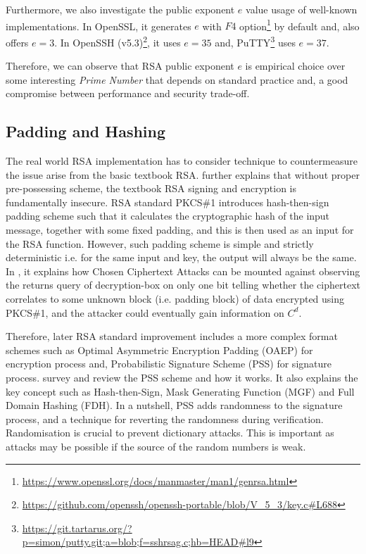 \documentclass[10pt,sigconf]{acmart}
\begin{document}
Furthermore, we also investigate the public exponent $e$ value usage of well-known implementations. In OpenSSL, it generates $e$ with $F4$ option\footnote{\url{https://www.openssl.org/docs/manmaster/man1/genrsa.html}} by default and, also offers $e=3$. In OpenSSH (v5.3)\footnote{\url{https://github.com/openssh/openssh-portable/blob/V_5_3/key.c\#L688}}, it uses $e = 35$ and,  PuTTY\footnote{\url{https://git.tartarus.org/?p=simon/putty.git;a=blob;f=sshrsag.c;hb=HEAD\#l9}} uses $e = 37$.

Therefore, we can observe that RSA public exponent $e$ is empirical choice over some interesting \textit{Prime Number} that depends on standard practice and, a good compromise between performance and security trade-off.

\subsection{Padding and Hashing}

The real world RSA implementation has to consider technique to countermeasure the issue arise from the basic textbook RSA. \cite{boneh2000textbook} further explains that without proper pre-possessing scheme, the textbook RSA signing and encryption is fundamentally insecure. RSA standard PKCS\#1 introduces hash-then-sign padding scheme such that it calculates the cryptographic hash of the input message, together with some fixed padding, and this is then used as an input for the RSA function. However, such padding scheme is simple and strictly deterministic i.e. for the same input and key, the output will always be the same. In \cite{bleichenbacher1998chosen}, it explains how Chosen Ciphertext Attacks can be mounted against observing the returns query of decryption-box on only one bit telling whether the ciphertext correlates to some unknown block (i.e. padding block) of data encrypted using PKCS\#1, and the attacker could eventually gain information on $C^d$.

Therefore, later RSA standard improvement includes a more complex format schemes such as Optimal Asymmetric Encryption Padding (OAEP) \cite{bellare1994optimal} for encryption process and, Probabilistic Signature Scheme (PSS) \cite{bellare2001probabilistic} for signature process. \cite{bock2011rsa} survey and review the PSS scheme and how it works. It also explains the key concept such as Hash-then-Sign, Mask Generating Function (MGF) and Full Domain Hashing (FDH). In a nutshell, PSS adds randomness to the signature process, and a technique for reverting the randomness during verification. Randomisation is crucial to prevent dictionary attacks. This is important as attacks may be possible if the source of the random numbers is weak.
\end{document}
